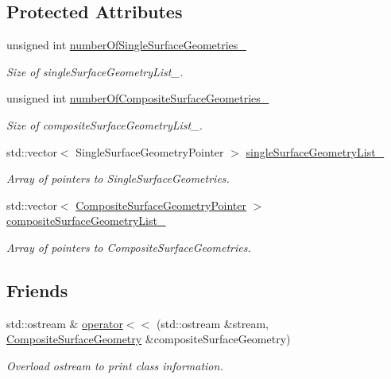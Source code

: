 \subsection*{Protected Attributes}
\begin{DoxyCompactItemize}
\item 
unsigned int \hyperlink{classtudat_1_1geometric__shapes_1_1CompositeSurfaceGeometry_a8ed9f8e2483f0cce40a90db9313844c1}{number\+Of\+Single\+Surface\+Geometries\+\_\+}
\begin{DoxyCompactList}\small\item\em Size of single\+Surface\+Geometry\+List\+\_\+. \end{DoxyCompactList}\item 
unsigned int \hyperlink{classtudat_1_1geometric__shapes_1_1CompositeSurfaceGeometry_a11b903bd3673915b555e647b98388e06}{number\+Of\+Composite\+Surface\+Geometries\+\_\+}
\begin{DoxyCompactList}\small\item\em Size of composite\+Surface\+Geometry\+List\+\_\+. \end{DoxyCompactList}\item 
std\+::vector$<$ Single\+Surface\+Geometry\+Pointer $>$ \hyperlink{classtudat_1_1geometric__shapes_1_1CompositeSurfaceGeometry_a98349fc2023b545d49ae7f8d51967a78}{single\+Surface\+Geometry\+List\+\_\+}
\begin{DoxyCompactList}\small\item\em Array of pointers to Single\+Surface\+Geometries. \end{DoxyCompactList}\item 
std\+::vector$<$ \hyperlink{classtudat_1_1geometric__shapes_1_1CompositeSurfaceGeometry_aea778d4252cf5812c10f4ce0b84f7f6e}{Composite\+Surface\+Geometry\+Pointer} $>$ \hyperlink{classtudat_1_1geometric__shapes_1_1CompositeSurfaceGeometry_a83b4e6b21537f894714dcc9b3fdf2c13}{composite\+Surface\+Geometry\+List\+\_\+}
\begin{DoxyCompactList}\small\item\em Array of pointers to Composite\+Surface\+Geometries. \end{DoxyCompactList}\end{DoxyCompactItemize}
\subsection*{Friends}
\begin{DoxyCompactItemize}
\item 
std\+::ostream \& \hyperlink{classtudat_1_1geometric__shapes_1_1CompositeSurfaceGeometry_ab84f7e6ad680c0300d822657c141a97a}{operator$<$$<$} (std\+::ostream \&stream, \hyperlink{classtudat_1_1geometric__shapes_1_1CompositeSurfaceGeometry}{Composite\+Surface\+Geometry} \&composite\+Surface\+Geometry)
\begin{DoxyCompactList}\small\item\em Overload ostream to print class information. \end{DoxyCompactList}\end{DoxyCompactItemize}


